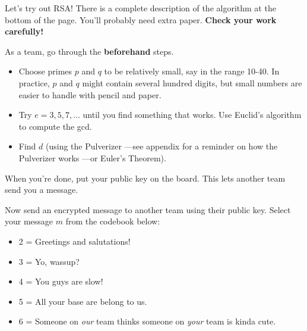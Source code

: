 



\begin{problem}
Let's try out RSA!  There is a complete description of the algorithm at
the bottom of the page.  You'll probably need extra paper.  \textbf{Check
your work carefully!}

\bparts

\ppart As a team, go through the \textbf{beforehand} steps.

\begin{itemize}

\item Choose primes $p$ and $q$ to be relatively small, say in the
range 10-40.  In practice, $p$ and $q$ might contain several hundred
digits, but small numbers are easier to handle with pencil and paper.

\item Try $e = 3, 5, 7, \ldots$ until you find something that works.
Use Euclid's algorithm to compute the gcd.

\item Find $d$ (using the Pulverizer ---see appendix for a reminder on how
the Pulverizer works ---or Euler's Theorem).

\end{itemize}

When you're done, put your public key on the board.  This lets another
team send you a message.

\ppart Now send an encrypted message to another team using their
public key.  Select your message $m$ from the codebook below:

\begin{itemize}

\item 2 = Greetings and salutations!

\item 3 = Yo, wassup?

\item 4 = You guys are slow!

\item 5 = All your base are belong to us.

\item 6 = Someone on {\em our} team thinks someone on {\em your} team
is kinda cute.


\end{itemize}
\end{problem}
